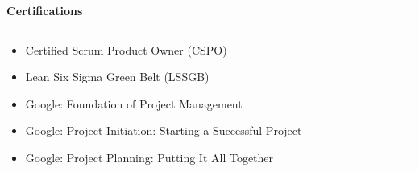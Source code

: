 \documentclass[9pt,letterpaper]{article} %
\newenvironment{rSection}[1]{ %
  \sectionskip
 \textbf{\Large #1} %
  \sectionlineskip
  \hrule %
  \begin{list}{}{ %
    \setlength{\leftmargin}{-0em} %
  }
  \item[]
}{
  \end{list}
}
\def\sectionlineskip{\smallskip} %
\def\sectionskip{} %
\begin{document}
\begin{rSection}{Certifications}
\item[] \vspace{-1em}
\begin{itemize}[left=-1.5em, labelsep=.1cm, labelwidth=.2cm, itemsep=0.0em]
\item Certified Scrum Product Owner (CSPO)
\item Lean Six Sigma Green Belt (LSSGB)
\item Google: Foundation of Project Management
\item Google: Project Initiation: Starting a Successful Project
\item Google: Project Planning: Putting It All Together
\end{itemize}
\end{rSection}
\end{document}
